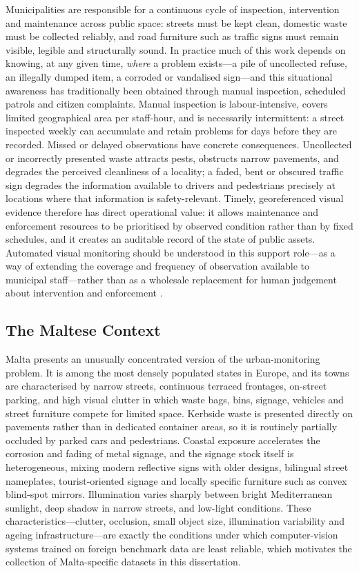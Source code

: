 Municipalities are responsible for a continuous cycle of inspection, intervention and maintenance across public space: streets must be kept clean, domestic waste must be collected reliably, and road furniture such as traffic signs must remain visible, legible and structurally sound. In practice much of this work depends on knowing, at any given time, \emph{where} a problem exists---a pile of uncollected refuse, an illegally dumped item, a corroded or vandalised sign---and this situational awareness has traditionally been obtained through manual inspection, scheduled patrols and citizen complaints. Manual inspection is labour-intensive, covers limited geographical area per staff-hour, and is necessarily intermittent: a street inspected weekly can accumulate and retain problems for days before they are recorded. Missed or delayed observations have concrete consequences. Uncollected or incorrectly presented waste attracts pests, obstructs narrow pavements, and degrades the perceived cleanliness of a locality; a faded, bent or obscured traffic sign degrades the information available to drivers and pedestrians precisely at locations where that information is safety-relevant. Timely, georeferenced visual evidence therefore has direct operational value: it allows maintenance and enforcement resources to be prioritised by observed condition rather than by fixed schedules, and it creates an auditable record of the state of public assets. Automated visual monitoring should be understood in this support role---as a way of extending the coverage and frequency of observation available to municipal staff---rather than as a wholesale replacement for human judgement about intervention and enforcement \citep{chen2019deep,merolla2025improving}.

\subsection{The Maltese Context}
\label{sec:bg-malta}

Malta presents an unusually concentrated version of the urban-monitoring problem. It is among the most densely populated states in Europe, and its towns are characterised by narrow streets, continuous terraced frontages, on-street parking, and high visual clutter in which waste bags, bins, signage, vehicles and street furniture compete for limited space. Kerbside waste is presented directly on pavements rather than in dedicated container areas, so it is routinely partially occluded by parked cars and pedestrians. Coastal exposure accelerates the corrosion and fading of metal signage, and the signage stock itself is heterogeneous, mixing modern reflective signs with older designs, bilingual street nameplates, tourist-oriented signage and locally specific furniture such as convex blind-spot mirrors. Illumination varies sharply between bright Mediterranean sunlight, deep shadow in narrow streets, and low-light conditions. These characteristics---clutter, occlusion, small object size, illumination variability and ageing infrastructure---are exactly the conditions under which computer-vision systems trained on foreign benchmark data are least reliable, which motivates the collection of Malta-specific datasets in this dissertation.

